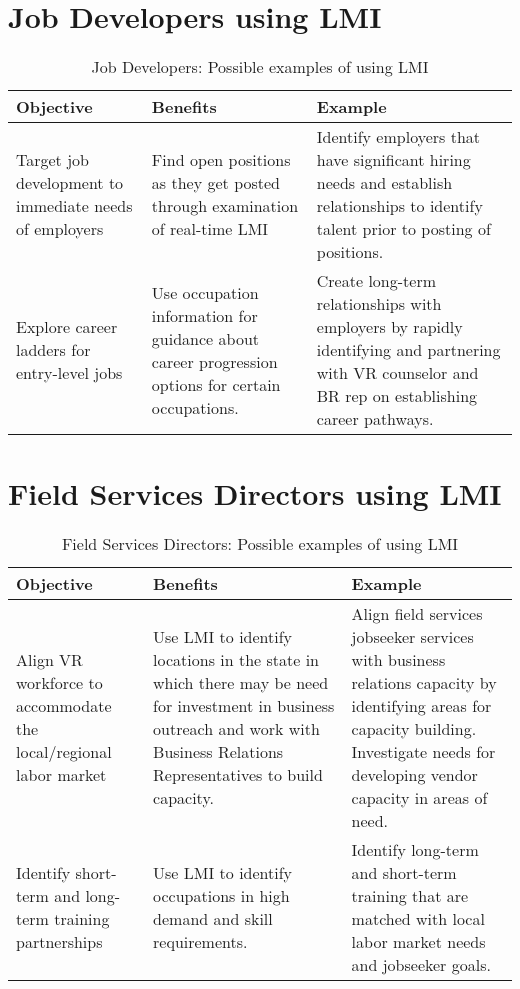 \documentclass[]{book}
\theoremstyle{definition}
\theoremstyle{definition}
\theoremstyle{definition}
\theoremstyle{remark}
\begin{document}
\section{Job Developers using LMI}\label{job-developers-using-lmi}

\begin{longtable}[t]{lll}
\caption{\label{tab:unnamed-chunk-4}Job Developers: Possible examples of using LMI}\\
\toprule
Objective & Benefits & Example\\
\midrule
Target job development to immediate needs of employers & Find open positions as they get posted through examination of real-time LMI & Identify employers that have significant hiring needs and establish relationships to identify talent prior to posting of positions.\\
Explore career ladders for entry-level jobs & Use occupation information for guidance about career progression options for certain occupations. & Create long-term relationships with employers by rapidly identifying and partnering with VR counselor and BR rep on establishing career pathways.\\
\bottomrule
\end{longtable}

\section{Field Services Directors using
LMI}\label{field-services-directors-using-lmi}

\begin{longtable}[t]{lll}
\caption{\label{tab:unnamed-chunk-5}Field Services Directors: Possible examples of using LMI}\\
\toprule
Objective & Benefits & Example\\
\midrule
Align VR workforce to accommodate the local/regional labor market & Use LMI to identify locations in the state in which there may be need for investment in business outreach and work with Business Relations Representatives to build capacity. & Align field services jobseeker services with business relations capacity by identifying areas for capacity building. Investigate needs for developing vendor capacity in areas of need.\\
Identify short-term and long-term training partnerships & Use LMI to identify occupations in high demand and skill requirements. & Identify long-term and short-term training that are matched with local labor market needs and jobseeker goals.\\
\bottomrule
\end{longtable}
\end{document}
